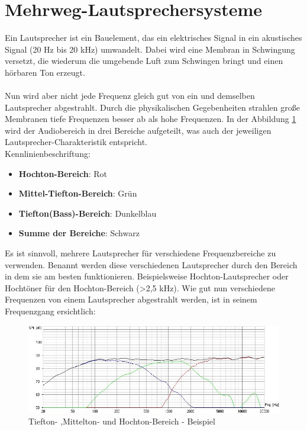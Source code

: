 \section{Mehrweg-Lautsprechersysteme}\label{sec:3.2}
Ein Lautsprecher ist ein Bauelement, das ein elektrisches Signal in ein akustisches Signal (20 Hz bis 20 kHz) umwandelt.
Dabei wird eine Membran in Schwingung versetzt, die wiederum die umgebende Luft zum Schwingen bringt und einen hörbaren Ton erzeugt.
\\ \\
Nun wird aber nicht jede Frequenz gleich gut von ein und demselben Lautsprecher abgestrahlt.
Durch die physikalischen Gegebenheiten strahlen große Membranen tiefe Frequenzen besser ab als hohe Frequenzen.
In der Abbildung \ref{fig:3.2.1} wird der Audiobereich in drei Bereiche aufgeteilt, was auch der jeweiligen Lautsprecher-Charakteristik entspricht.\\
Kennlinienbeschriftung:\\
\begin{itemize}
	\item \textbf{Hochton-Bereich}: Rot
	\item \textbf{Mittel-Tiefton-Bereich}: Grün
	\item \textbf{Tiefton(Bass)-Bereich}: Dunkelblau
	\item \textbf{Summe der Bereiche}: Schwarz	
\end{itemize}
Es ist sinnvoll, mehrere Lautsprecher für verschiedene Frequenzbereiche zu verwenden.
Benannt werden diese verschiedenen Lautsprecher durch den Bereich in dem sie am besten funktionieren.
Beispielsweise Hochton-Lautsprecher oder Hochtöner für den Hochton-Bereich (>2,5 kHz).
Wie gut nun verschiedene Frequenzen von einem Lautsprecher abgestrahlt werden, ist in seinem Frequenzgang ersichtlich:
\begin{figure} [H]
	\centering
	\includegraphics[width=1\textwidth]{img/Grundlagen/Mehrweg-Lautsprechersysteme/Frequenzbereiche-Audio-cut.jpg}
	\caption{Tiefton- ,Mittelton- und Hochton-Bereich - Beispiel}
	\label{fig:3.2.1}
\end{figure}

